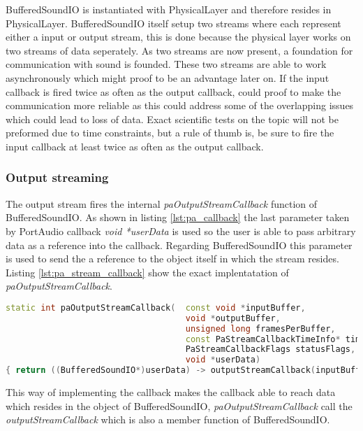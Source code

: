 	BufferedSoundIO is instantiated with PhysicalLayer and therefore resides in PhysicalLayer. BufferedSoundIO itself setup two streams where each
	represent either a input or output stream, this is done because the physical layer works on two streams of data seperately. As two streams are 
	now present, a foundation for communication with sound is founded. These two streams are able to work asynchronously which might proof to be an
	advantage later on. If the input callback is fired twice as often as the output callback, could proof to make the communication more reliable
	as this could address some of the overlapping issues which could lead to loss of data. Exact scientific tests on the topic will not be preformed
	due to time constraints, but a rule of thumb is, be sure to fire the input callback at least twice as often as the output callback.
	
		\subsubsection{Output streaming}
		The output stream fires the internal \textit{paOutputStreamCallback} function of BufferedSoundIO. As shown in listing \ref{lst:pa_callback}
		the last parameter taken by PortAudio callback \textit{void *userData} is used so the user is able to pass arbitrary data as a reference into the
		callback. Regarding BufferedSoundIO this parameter is used to send the a reference to the object itself in which the stream resides. 
		Listing \ref{lst:pa_stream_callback} show the exact implentatation of \textit{paOutputStreamCallback}.
		
		\begin{lstlisting}[float=htb,language={C++},caption={Implementation of \textit{paOutputStreamCallback}.}]
static int paOutputStreamCallback(	const void *inputBuffer,
									void *outputBuffer,
									unsigned long framesPerBuffer,
									const PaStreamCallbackTimeInfo* timeInfo,
									PaStreamCallbackFlags statusFlags,
									void *userData)
{ return ((BufferedSoundIO*)userData) -> outputStreamCallback(inputBuffer, outputBuffer, framesPerBuffer, timeInfo, statusFlags); }
		\end{lstlisting}\label{lst:pa_stream_callback}
		
		This way of implementing the callback makes the callback able to reach data which resides in the object of BufferedSoundIO,
		\textit{paOutputStreamCallback} call the \textit{outputStreamCallback} which is also a member function of BufferedSoundIO.
		
